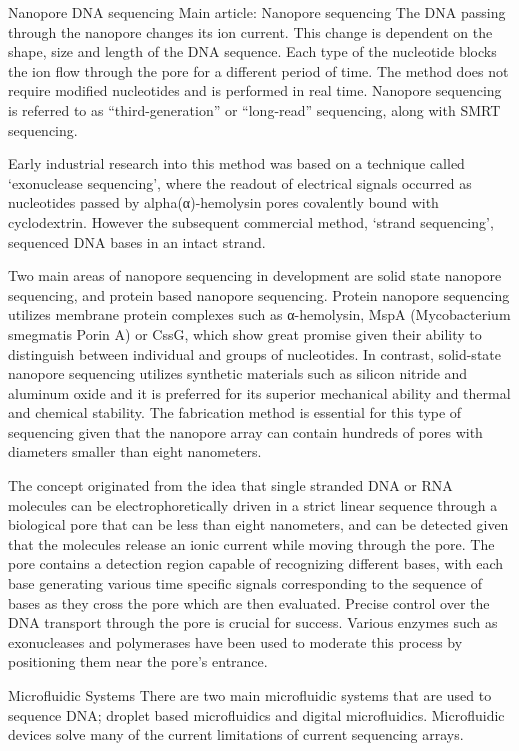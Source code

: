 Nanopore DNA sequencing
Main article: Nanopore sequencing
The DNA passing through the nanopore changes its ion current. This change is dependent on the shape, size and length of the DNA sequence. Each type of the nucleotide blocks the ion flow through the pore for a different period of time. The method does not require modified nucleotides and is performed in real time. Nanopore sequencing is referred to as ``third-generation'' or ``long-read'' sequencing, along with SMRT sequencing.

Early industrial research into this method was based on a technique called `exonuclease sequencing', where the readout of electrical signals occurred as nucleotides passed by alpha(α)-hemolysin pores covalently bound with cyclodextrin. However the subsequent commercial method, `strand sequencing', sequenced DNA bases in an intact strand.

Two main areas of nanopore sequencing in development are solid state nanopore sequencing, and protein based nanopore sequencing. Protein nanopore sequencing utilizes membrane protein complexes such as α-hemolysin, MspA (Mycobacterium smegmatis Porin A) or CssG, which show great promise given their ability to distinguish between individual and groups of nucleotides. In contrast, solid-state nanopore sequencing utilizes synthetic materials such as silicon nitride and aluminum oxide and it is preferred for its superior mechanical ability and thermal and chemical stability. The fabrication method is essential for this type of sequencing given that the nanopore array can contain hundreds of pores with diameters smaller than eight nanometers.

The concept originated from the idea that single stranded DNA or RNA molecules can be electrophoretically driven in a strict linear sequence through a biological pore that can be less than eight nanometers, and can be detected given that the molecules release an ionic current while moving through the pore. The pore contains a detection region capable of recognizing different bases, with each base generating various time specific signals corresponding to the sequence of bases as they cross the pore which are then evaluated. Precise control over the DNA transport through the pore is crucial for success. Various enzymes such as exonucleases and polymerases have been used to moderate this process by positioning them near the pore's entrance.

Microfluidic Systems
There are two main microfluidic systems that are used to sequence DNA; droplet based microfluidics and digital microfluidics. Microfluidic devices solve many of the current limitations of current sequencing arrays.

